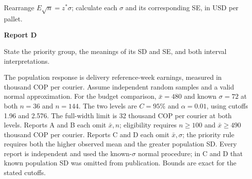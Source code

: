Rearrange $E\sqrt n=z^*\sigma$; calculate each $\sigma$ and its corresponding SE, in USD per pallet.
{\textbf{Report D}\par\guidedresponsebox[32mm]{\dimexpr\linewidth-1pt\relax}}
State the priority group, the meanings of its SD and SE, and both interval interpretations.\par\nopagebreak[4]
\guidedresponsebox[42mm]{\dimexpr\linewidth-1pt\relax}
\par\clearpage
\endgroup

The population response is delivery reference-week earnings, measured in thousand COP per courier. Assume independent random samples and a valid normal approximation. For the budget comparison, $\bar x=480$ and known $\sigma=72$ at both $n=36$ and $n=144$. The two levels are $C=95\%$ and $\alpha=0.01$, using cutoffs 1.96 and 2.576. The full-width limit is 32 thousand COP per courier at both levels.
Reports A and B each omit $\bar x,n$; eligibility requires $n\ge100$ and $\bar x\ge490$ thousand COP per courier. Reports C and D each omit $\bar x,\sigma$; the priority rule requires both the higher observed mean and the greater population SD. Every report is independent and used the known-$\sigma$ normal procedure; in C and D that known population SD was omitted from publication. Bounds are exact for the stated cutoffs.

